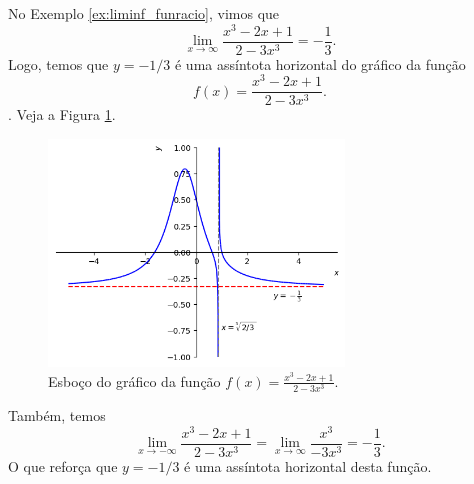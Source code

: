 \begin{ex}\label{ex:ass_hor}
  No Exemplo \ref{ex:liminf_funracio}, vimos que
  \begin{equation}
    \lim_{x\to\infty} \frac{x^3 - 2x + 1}{2 - 3x^3} = -\frac{1}{3}.
  \end{equation}
  Logo, temos que $y=-1/3$ é uma assíntota horizontal do gráfico da função
  \begin{equation}
    f(x) = \frac{x^3 - 2x + 1}{2 - 3x^3}.
  \end{equation}
  . Veja a Figura \ref{fig:ex_ass_horizon}.

      \begin{figure}[H]
      \centering
      \includegraphics[width=0.7\textwidth]{./cap_lim/dados/fig_ex_ass_horizon/fig_ex_ass_horizon}
      \caption{Esboço do gráfico da função $\displaystyle f(x) = \frac{x^3 - 2x + 1}{2 - 3x^3}$.}
      \label{fig:ex_ass_horizon}
    \end{figure}

  Também, temos
  \begin{equation}
    \lim_{x\to -\infty} \frac{x^3 - 2x + 1}{2 - 3x^3} = \lim_{x\to\infty} \frac{x^3}{-3x^3} = -\frac{1}{3}.
  \end{equation}
  O que reforça que $y = -1/3$ é uma assíntota horizontal desta função.
\end{ex}

